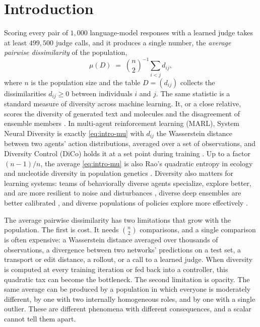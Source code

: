 \documentclass[twoside,11pt]{article}
\begin{document}
\section{Introduction}
\label{sec:intro}

Scoring every pair of $1{,}000$ language-model responses with a learned
judge takes at least $499{,}500$ judge calls, and it produces a single number, the
\emph{average pairwise dissimilarity} of the population,
\begin{equation}
  \mu(D) \;=\; \binom{n}{2}^{-1}\sum_{i<j} d_{ij},
  \label{eq:intro-mu}
\end{equation}
where $n$ is the population size and the table $D=(d_{ij})$ collects the
dissimilarities $d_{ij}\ge 0$ between individuals $i$ and $j$. The same statistic is a standard measure of diversity across
machine learning. It, or a close relative, scores the
diversity of generated text and molecules
\citep{zhu2018texygen,polykovskiy2020molecular,kirk2024understanding} and
the disagreement of ensemble members \citep{kuncheva2003measures}. In
multi-agent reinforcement learning (MARL), System Neural Diversity
\citep[SND;][]{bettini2025snd} is exactly \eqref{eq:intro-mu} with $d_{ij}$
the Wasserstein distance between two agents' action distributions, averaged
over a set of observations, and
Diversity Control (DiCo) holds it at a set point during training
\citep{bettini2024dico}. Up to a factor $(n-1)/n$, the average \eqref{eq:intro-mu} is also Rao's
quadratic entropy in ecology \citep{rao1982diversity} and nucleotide
diversity in population genetics \citep{nei1979mathematical}. Diversity
also matters for learning systems: teams of behaviorally diverse agents
specialize, explore better, and are more resilient to noise and
disturbances \citep{bettini2023hetgppo,bettini2024dico,bettini2025snd}, diverse deep ensembles are
better calibrated \citep{lakshminarayanan2017simple}, and diverse
populations of policies explore more effectively
\citep{lehman2011abandoning,parker-holder2020effective}.

The average pairwise dissimilarity has two limitations that grow with the
population. The first is cost. It needs $\binom{n}{2}$ comparisons, and a
single comparison is often expensive: a Wasserstein distance averaged over
thousands of observations, a divergence between two networks' predictions
on a test set, a transport or edit distance, a rollout, or a call to a
learned judge. When diversity is computed at every
training iteration or fed back into a controller, this quadratic tax
can become the bottleneck. The second limitation is opacity. The same average
can be produced by a population in which everyone is moderately different, by
one with two internally homogeneous roles, and by one with a single
outlier. These are different phenomena with different consequences, and a
scalar cannot tell them apart.
\end{document}
